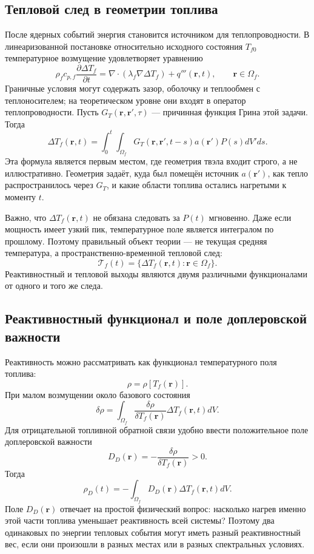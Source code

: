 \documentclass[12pt]{article}
\begin{document}
\subsection{Тепловой след в геометрии топлива}

После ядерных событий энергия становится источником для теплопроводности. В линеаризованной постановке относительно исходного состояния \(T_{f0}\) температурное возмущение удовлетворяет уравнению
\[
\rho_f c_{p,f}\frac{\partial \Delta T_f}{\partial t}
=
\nabla\cdot\left(\lambda_f\nabla\Delta T_f\right)
+
q'''(\mathbf r,t),
\qquad
\mathbf r\in\Omega_f.
\]
Граничные условия могут содержать зазор, оболочку и теплообмен с теплоносителем; на теоретическом уровне они входят в оператор теплопроводности. Пусть \(G_T(\mathbf r,\mathbf r',\tau)\) --- причинная функция Грина этой задачи. Тогда
\[
\Delta T_f(\mathbf r,t)
=
\int_0^t\int_{\Omega_f}
G_T(\mathbf r,\mathbf r',t-s)a(\mathbf r')P(s)dV'ds.
\]
Эта формула является первым местом, где геометрия твэла входит строго, а не иллюстративно. Геометрия задаёт, куда был помещён источник \(a(\mathbf r')\), как тепло распространилось через \(G_T\), и какие области топлива остались нагретыми к моменту \(t\).

Важно, что \(\Delta T_f(\mathbf r,t)\) не обязана следовать за \(P(t)\) мгновенно. Даже если мощность имеет узкий пик, температурное поле является интегралом по прошлому. Поэтому правильный объект теории --- не текущая средняя температура, а пространственно-временной тепловой след:
\[
\mathcal T_f(t)=\{\Delta T_f(\mathbf r,t):\mathbf r\in\Omega_f\}.
\]
Реактивностный и тепловой выходы являются двумя различными функционалами от одного и того же следа.

\subsection{Реактивностный функционал и поле доплеровской важности}

Реактивность можно рассматривать как функционал температурного поля топлива:
\[
\rho=\rho[T_f(\mathbf r)].
\]
При малом возмущении около базового состояния
\[
\delta\rho
=
\int_{\Omega_f}
\frac{\delta\rho}{\delta T_f(\mathbf r)}
\Delta T_f(\mathbf r,t)dV.
\]
Для отрицательной топливной обратной связи удобно ввести положительное поле доплеровской важности
\[
D_D(\mathbf r)
=
-\frac{\delta\rho}{\delta T_f(\mathbf r)}>0.
\]
Тогда
\[
\rho_D(t)
=
-\int_{\Omega_f}D_D(\mathbf r)\Delta T_f(\mathbf r,t)dV.
\]
Поле \(D_D(\mathbf r)\) отвечает на простой физический вопрос: насколько нагрев именно этой части топлива уменьшает реактивность всей системы? Поэтому два одинаковых по энергии тепловых события могут иметь разный реактивностный вес, если они произошли в разных местах или в разных спектральных условиях.
\end{document}
